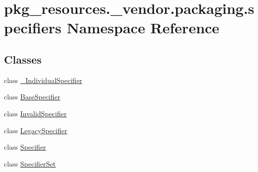 \hypertarget{namespacepkg__resources_1_1__vendor_1_1packaging_1_1specifiers}{}\section{pkg\+\_\+resources.\+\_\+vendor.\+packaging.\+specifiers Namespace Reference}
\label{namespacepkg__resources_1_1__vendor_1_1packaging_1_1specifiers}
\subsection*{Classes}
\begin{DoxyCompactItemize}
\item 
class \hyperlink{classpkg__resources_1_1__vendor_1_1packaging_1_1specifiers_1_1___individual_specifier}{\+\_\+\+Individual\+Specifier}
\item 
class \hyperlink{classpkg__resources_1_1__vendor_1_1packaging_1_1specifiers_1_1_base_specifier}{Base\+Specifier}
\item 
class \hyperlink{classpkg__resources_1_1__vendor_1_1packaging_1_1specifiers_1_1_invalid_specifier}{Invalid\+Specifier}
\item 
class \hyperlink{classpkg__resources_1_1__vendor_1_1packaging_1_1specifiers_1_1_legacy_specifier}{Legacy\+Specifier}
\item 
class \hyperlink{classpkg__resources_1_1__vendor_1_1packaging_1_1specifiers_1_1_specifier}{Specifier}
\item 
class \hyperlink{classpkg__resources_1_1__vendor_1_1packaging_1_1specifiers_1_1_specifier_set}{Specifier\+Set}
\end{DoxyCompactItemize}
